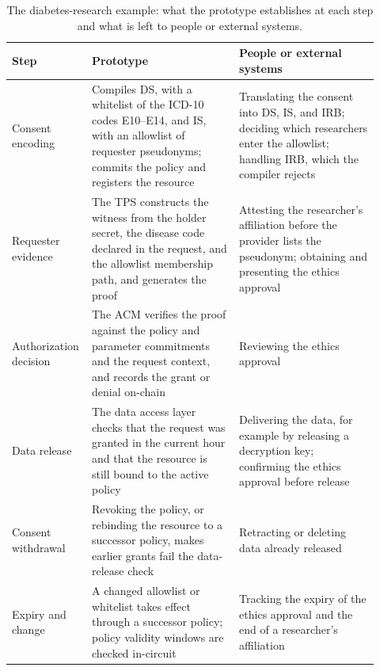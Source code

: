 \begin{table}[htbp]
	\centering\footnotesize
	\caption{The diabetes-research example: what the prototype establishes at each step and what is left to people or external systems.}
	\label{tab:walkthrough}
	\setlength{\tabcolsep}{4pt}
	\begin{tabular}{>{\raggedright\arraybackslash}p{0.16\linewidth}>{\raggedright\arraybackslash}p{0.39\linewidth}>{\raggedright\arraybackslash}p{0.37\linewidth}}
		\toprule
		Step                  & Prototype                                                                                                                                         & People or external systems                                                                                       \\
		\midrule
		Consent encoding      & Compiles DS, with a whitelist of the ICD-10 codes E10--E14, and IS, with an allowlist of requester pseudonyms; commits the policy and registers the resource & Translating the consent into DS, IS, and IRB; deciding which researchers enter the allowlist; handling IRB, which the compiler rejects \\
		\addlinespace
		Requester evidence    & The TPS constructs the witness from the holder secret, the disease code declared in the request, and the allowlist membership path, and generates the proof & Attesting the researcher's affiliation before the provider lists the pseudonym; obtaining and presenting the ethics approval \\
		\addlinespace
		Authorization decision & The ACM verifies the proof against the policy and parameter commitments and the request context, and records the grant or denial on-chain       & Reviewing the ethics approval                                                                                    \\
		\addlinespace
		Data release          & The data access layer checks that the request was granted in the current hour and that the resource is still bound to the active policy          & Delivering the data, for example by releasing a decryption key; confirming the ethics approval before release     \\
		\addlinespace
		Consent withdrawal    & Revoking the policy, or rebinding the resource to a successor policy, makes earlier grants fail the data-release check                           & Retracting or deleting data already released                                                                     \\
		\addlinespace
		Expiry and change     & A changed allowlist or whitelist takes effect through a successor policy; policy validity windows are checked in-circuit                         & Tracking the expiry of the ethics approval and the end of a researcher's affiliation                             \\
		\bottomrule
	\end{tabular}


\end{table}
